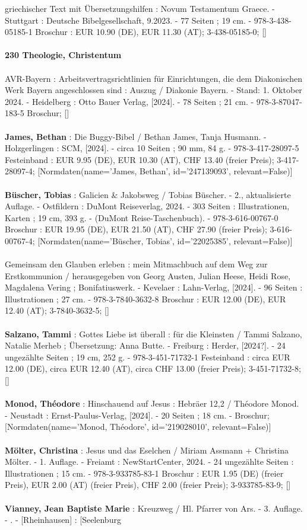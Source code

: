 \documentclass{article}
\begin{document}
\begin{multicols}{3}
griechischer Text mit Übersetzungshilfen : Novum Testamentum Graece. - Stuttgart : Deutsche Bibelgesellschaft, 9.2023. - 77 Seiten ; 19 cm. - 978-3-438-05185-1 Broschur : EUR 10.90 (DE), EUR 11.30 (AT); 3-438-05185-0; []\\\\\textbf{230 Theologie, Christentum}\\\\AVR-Bayern : Arbeitsvertragsrichtlinien für Einrichtungen, die dem Diakonischen Werk Bayern angeschlossen sind : Auszug / Diakonie Bayern. - Stand: 1. Oktober 2024. - Heidelberg : Otto Bauer Verlag, [2024]. - 78 Seiten ; 21 cm. - 978-3-87047-183-5 Broschur; []\\\\\textbf{James, Bethan} : Die Buggy-Bibel / Bethan James, Tanja Husmann. - Holzgerlingen : SCM, [2024]. - circa 10 Seiten ; 90 mm, 84 g. - 978-3-417-28097-5 Festeinband : EUR 9.95 (DE), EUR 10.30 (AT), CHF 13.40 (freier Preis); 3-417-28097-4; [Normdaten(name='James, Bethan', id='247139093', relevant=False)]\\\\\textbf{Büscher, Tobias} : Galicien \& Jakobsweg / Tobias Büscher. - 2., aktualisierte Auflage. - Ostfildern : DuMont Reiseverlag, 2024. - 303 Seiten : Illustrationen, Karten ; 19 cm, 393 g. - (DuMont Reise-Taschenbuch). - 978-3-616-00767-0 Broschur : EUR 19.95 (DE), EUR 21.50 (AT), CHF 27.90 (freier Preis); 3-616-00767-4; [Normdaten(name='Büscher, Tobias', id='22025385', relevant=False)]\\\\Gemeinsam den Glauben erleben : mein Mitmachbuch auf dem Weg zur Erstkommunion / herausgegeben von Georg Austen, Julian Heese, Heidi Rose, Magdalena Vering ; Bonifatiuswerk. - Kevelaer : Lahn-Verlag, [2024]. - 96 Seiten : Illustrationen ; 27 cm. - 978-3-7840-3632-8 Broschur : EUR 12.00 (DE), EUR 12.40 (AT); 3-7840-3632-5; []\\\\\textbf{Salzano, Tammi} : Gottes Liebe ist überall : für die Kleinsten / Tammi Salzano, Natalie Merheb ; Übersetzung: Anna Butte. - Freiburg : Herder, [2024?]. - 24 ungezählte Seiten ; 19 cm, 252 g. - 978-3-451-71732-1 Festeinband : circa EUR 12.00 (DE), circa EUR 12.40 (AT), circa CHF 13.00 (freier Preis); 3-451-71732-8; []\\\\\textbf{Monod, Théodore} : Hinschauend auf Jesus : Hebräer 12,2 / Théodore Monod. - Neustadt : Ernst-Paulus-Verlag, [2024]. - 20 Seiten ; 18 cm. - Broschur; [Normdaten(name='Monod, Théodore', id='219028010', relevant=False)]\\\\\textbf{Mölter, Christina} : Jesus und das Eselchen / Miriam Assmann + Christina Mölter. - 1. Auflage. - Freiamt : NewStartCenter, 2024. - 24 ungezählte Seiten : Illustrationen ; 15 cm. - 978-3-933785-83-1 Broschur : EUR 1.95 (DE) (freier Preis), EUR 2.00 (AT) (freier Preis), CHF 2.00 (freier Preis); 3-933785-83-9; []\\\\\textbf{Vianney, Jean Baptiste Marie} : Kreuzweg / Hl. Pfarrer von Ars. - 3. Auflage. - . - [Rheinhausen] : [Seelenburg 
\end{multicols}
\end{document}
